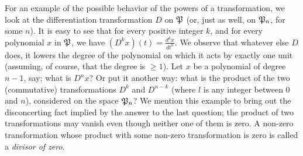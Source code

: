 For an example of the possible behavior of the powers of a transformation, we
look at the differentiation transformation \(D\) on \(\mathfrak{P}\) (or, just as
well, on \(\mathfrak{P}_n\), for some \(n\)). It is easy to see that for every
positive integer \(k\), and for every polynomial \(x\) in \(\mathfrak{P}\), we have
\(\displaystyle(D^k x)(t) = \frac{d^k x}{dt^k}\). We observe that whatever else
\(D\) does, it lowers the degree of the polynomial on which it acts by exactly
one unit (assuming, of course, that the degree is \(\geq 1\)). Let \(x\) be a
polynomial of degree \(n-1\), say; what is \(D^n x\)? Or put it another way:
what is the product of the two (commutative) transformations \(D^k\) and
\(D^{n-k}\) (where \(l\) is any integer between \(0\) and \(n\)), considered on
the space \(\mathfrak{P}_n\)? We mention this example to bring out the disconcerting
fact implied by the answer to the last question; the product of two
transformations may vanish even though neither one of them is zero. A non-zero
transformation whose product with some non-zero transformation is zero is called
a \emph{divisor of zero}.

